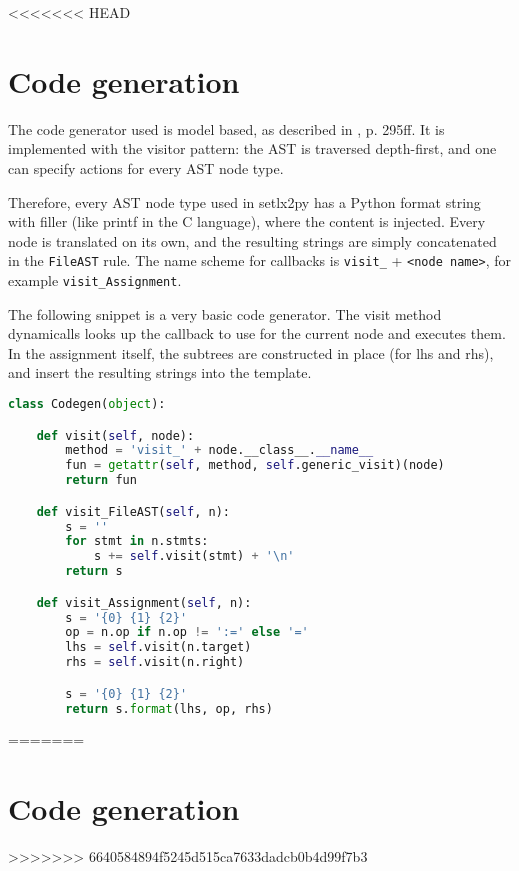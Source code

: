 <<<<<<< HEAD

\section{Code generation}

The code generator used is model based, as described in \cite{parr2010}{, p. 295ff}. It is implemented with the visitor pattern: the AST is traversed depth-first, and one can specify actions for every AST node type. 

Therefore, every AST node type used in setlx2py has a Python format string with filler (like printf in the C language), where the content is injected. Every node is translated on its own, and the resulting strings are simply concatenated in the \texttt{FileAST} rule. The name scheme for callbacks is \texttt{visit\_} + \texttt{<node name>}, for example \texttt{visit\_Assignment}. 

The following snippet is a very basic code generator. The visit method dynamicalls looks up the callback to use for the current node and executes them. In the assignment itself, the subtrees are constructed in place (for lhs and rhs), and insert the resulting strings into the template.

\begin{lstlisting}[language=python]
class Codegen(object):

    def visit(self, node):
        method = 'visit_' + node.__class__.__name__
        fun = getattr(self, method, self.generic_visit)(node)
        return fun

    def visit_FileAST(self, n):
        s = ''
        for stmt in n.stmts:
            s += self.visit(stmt) + '\n'
        return s

    def visit_Assignment(self, n):
        s = '{0} {1} {2}'
        op = n.op if n.op != ':=' else '='
        lhs = self.visit(n.target)
        rhs = self.visit(n.right)

        s = '{0} {1} {2}'
        return s.format(lhs, op, rhs)
\end{lstlisting}




 
=======

\section{Code generation}

\label{sec:codegen}
>>>>>>> 6640584894f5245d515ca7633dadcb0b4d99f7b3
